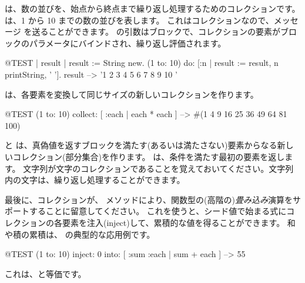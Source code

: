 \documentclass[a4paper,10pt,twoside]{book}
\begin{document}
 は、数の並びを、始点から終点まで繰り返し処理するためのコレクションです。
は、1 から 10 までの数の並びを表します。
これはコレクションなので、メッセージ  を送ることができます。
 の引数はブロックで、コレクションの要素がブロックのパラメータにバインドされ、繰り返し評価されます。

\begin{code}{@TEST | result |}
result := String new.
(1 to: 10) do: [:n | result := result, n printString, ' '].
result --> '1 2 3 4 5 6 7 8 9 10 '
\end{code}


 は、各要素を変換して同じサイズの新しいコレクションを作ります。
\begin{code}{@TEST}
(1 to: 10) collect: [ :each | each * each ] --> #(1 4 9 16 25 36 49 64 81 100)
\end{code}

 と  は、真偽値を返すブロックを満たす(あるいは満たさない)要素からなる新しいコレクション(部分集合)を作ります。
 は、条件を満たす最初の要素を返します。
文字列が文字のコレクションであることを覚えておいてください。文字列内の文字は、繰り返し処理することができます。


最後に、コレクションが、 メソッドにより、関数型の(高階の)\emph{畳み込み}演算をサポートすることに留意してください。
これを使うと、シード値で始まる式にコレクションの各要素を注入(inject)して、累積的な値を得ることができます。
和や積の累積は、 の典型的な応用例です。

\begin{code}{@TEST}
(1 to: 10) inject: 0 into: [ :sum :each | sum + each ] --> 55
\end{code}

\noindent
これは、と等価です。
\end{document}

